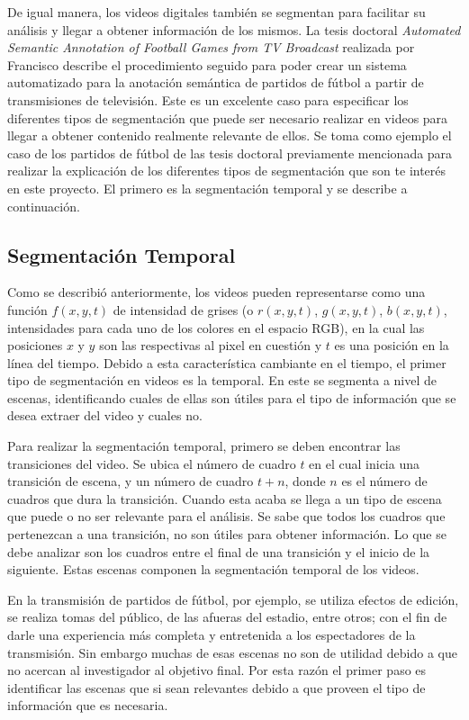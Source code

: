 De igual manera, los videos digitales también se segmentan para facilitar su análisis y llegar a obtener información de los mismos. La tesis doctoral \emph{Automated Semantic Annotation of Football Games from TV Broadcast} realizada por Francisco \cite{siles1} describe el procedimiento seguido para poder crear un sistema automatizado para la anotación semántica de partidos de fútbol a partir de transmisiones de televisión. Este es un excelente caso para especificar los diferentes tipos de segmentación que puede ser necesario realizar en videos para llegar a obtener contenido realmente relevante de ellos. Se toma como ejemplo el caso de los partidos de fútbol de las tesis doctoral previamente mencionada para realizar la explicación de los diferentes tipos de segmentación que son te interés en este proyecto. El primero es la segmentación temporal y se describe a continuación.

\subsection{Segmentación Temporal}

Como se describió anteriormente, los videos pueden representarse como una función $f(x,y,t)$ de intensidad de grises (o $r(x,y,t)$, $g(x,y,t)$, $b(x,y,t)$, intensidades para cada uno de los colores en el espacio RGB), en la cual las posiciones $x$ y $y$ son las respectivas al pixel en cuestión y $t$ es una posición en la línea del tiempo. Debido a esta característica cambiante en el tiempo, el primer tipo de segmentación en videos es la temporal. En este se segmenta a nivel de escenas, identificando cuales de ellas son útiles para el tipo de información que se desea extraer del video y cuales no. 

Para realizar la segmentación temporal, primero se deben encontrar las transiciones del video. Se ubica el número de cuadro $t$ en el cual inicia una transición de escena, y un número de cuadro $t+n$, donde $n$ es el número de cuadros que dura la transición. Cuando esta acaba se llega a un tipo de escena que puede o no ser relevante para el análisis. Se sabe que todos los cuadros que pertenezcan a una transición, no son útiles para obtener información. Lo que se debe analizar son los cuadros entre el final de una transición y el inicio de la siguiente. Estas escenas componen la segmentación temporal de los videos.

En la transmisión de partidos de fútbol, por ejemplo, se utiliza efectos de edición, se realiza tomas del público, de las afueras del estadio, entre otros; con el fin de darle una experiencia más completa y entretenida a los espectadores de la transmisión. Sin embargo muchas de esas escenas no son de utilidad debido a que no acercan al investigador al objetivo final. Por esta razón el primer paso es identificar las escenas que si sean relevantes debido a que proveen el tipo de información que es necesaria. 

